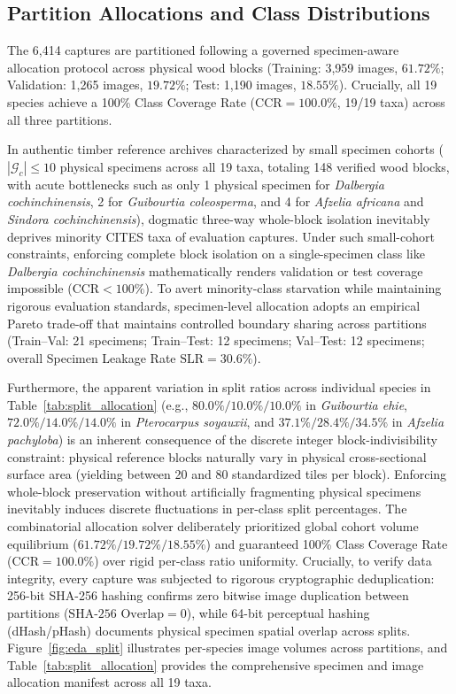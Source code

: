 \documentclass[a4paper,fleqn,12pt]{cas-sc}
\begin{document}
\subsection{Partition Allocations and Class Distributions}

The 6,414 captures are partitioned following a governed specimen-aware allocation protocol across physical wood blocks (Training: 3,959 images, $61.72\%$; Validation: 1,265 images, $19.72\%$; Test: 1,190 images, $18.55\%$). Crucially, all 19 species achieve a 100\% Class Coverage Rate ($\text{CCR} = 100.0\%$, 19/19 taxa) across all three partitions.

In authentic timber reference archives characterized by small specimen cohorts ($|\mathcal{G}_c| \le 10$ physical specimens across all 19 taxa, totaling 148 verified wood blocks, with acute bottlenecks such as only 1 physical specimen for \textit{Dalbergia cochinchinensis}, 2 for \textit{Guibourtia coleosperma}, and 4 for \textit{Afzelia africana} and \textit{Sindora cochinchinensis}), dogmatic three-way whole-block isolation inevitably deprives minority CITES taxa of evaluation captures. Under such small-cohort constraints, enforcing complete block isolation on a single-specimen class like \textit{Dalbergia cochinchinensis} mathematically renders validation or test coverage impossible ($\text{CCR} < 100\%$). To avert minority-class starvation while maintaining rigorous evaluation standards, specimen-level allocation adopts an empirical Pareto trade-off that maintains controlled boundary sharing across partitions (Train--Val: 21 specimens; Train--Test: 12 specimens; Val--Test: 12 specimens; overall Specimen Leakage Rate $\text{SLR} = 30.6\%$). 

Furthermore, the apparent variation in split ratios across individual species in Table~\ref{tab:split_allocation} (e.g., $80.0\%/10.0\%/10.0\%$ in \textit{Guibourtia ehie}, $72.0\%/14.0\%/14.0\%$ in \textit{Pterocarpus soyauxii}, and $37.1\%/28.4\%/34.5\%$ in \textit{Afzelia pachyloba}) is an inherent consequence of the discrete integer block-indivisibility constraint: physical reference blocks naturally vary in physical cross-sectional surface area (yielding between 20 and 80 standardized tiles per block). Enforcing whole-block preservation without artificially fragmenting physical specimens inevitably induces discrete fluctuations in per-class split percentages. The combinatorial allocation solver deliberately prioritized global cohort volume equilibrium ($61.72\% / 19.72\% / 18.55\%$) and guaranteed 100\% Class Coverage Rate ($\text{CCR} = 100.0\%$) over rigid per-class ratio uniformity. Crucially, to verify data integrity, every capture was subjected to rigorous cryptographic deduplication: 256-bit SHA-256 hashing confirms zero bitwise image duplication between partitions ($\text{SHA-256 Overlap} = 0$), while 64-bit perceptual hashing (dHash/pHash) documents physical specimen spatial overlap across splits. Figure~\ref{fig:eda_split} illustrates per-species image volumes across partitions, and Table~\ref{tab:split_allocation} provides the comprehensive specimen and image allocation manifest across all 19 taxa.
\end{document}
